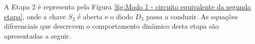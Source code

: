 A Etapa 2 é representa pela Figura \ref{fig:Modo 1 - circuito equivalente da segunda etapa}, onde a chave $S_2$ é aberta e o diodo $D_3$ passa a conduzir. As equações diferenciais que descrevem o comportamento dinâmico desta etapa são apresentadas a seguir.

  


    
    


    

